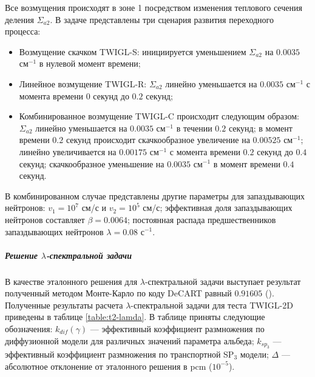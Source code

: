\documentclass{crm-article}
\begin{document}
Все возмущения происходят в зоне 1 посредством изменения теплового сечения деления $\Sigma_{a2}$.
В задаче представлены три сценария развития переходного процесса:
\begin{itemize}\itemsep1pt \parskip0pt 
\item Возмущение скачком TWIGL-S: инициируется уменьшением $\Sigma_{a2}$ на $0.0035$ см$^{-1}$ в нулевой момент времени;
\item Линейное возмущение TWIGL-R: $\Sigma_{a2}$ линейно уменьшается на $0.0035$ см$^{-1}$ с момента времени $0$ секунд до $0.2$ секунд;
\item Комбинированное возмущение TWIGL-C происходит следующим образом:
$\Sigma_{a2}$ линейно уменьшается на $0.0035$ см$^{-1}$ в течении $0.2$ секунд; в момент времени $0.2$ секунд происходит скачкообразное увеличение на $0.00525$ см$^{-1}$; линейно увеличивается на $0.00175$ см$^{-1}$  с момента времени $0.2$ секунд до $0.4$ секунд;  скачкообразное уменьшение на $0.0035$ см$^{-1}$ в момент времени $0.4$ секунд.
\end{itemize}
 
В комбинированном случае представлены другие параметры для запаздывающих нейтронов: $v_1 = 10^7$ см/с и $v_2 = 10^5$ см/с; эффективная доля запаздывающих нейтронов составляет $\beta = 0.0064$;  постоянная распада предшественников запаздывающих нейтронов $\lambda = 0.08$ с$^{-1}$. 

\subparagraph{Решение $\lambda$-спектральной задачи}
В качестве эталонного решения для $\lambda$-спектральной задачи выступает результат полученный методом Монте-Карло по коду DeCART равный $0.91605$ (\cite{joo2004}).
Полученные результаты расчета $\lambda$-спектральной задачи для теста TWIGL-2D приведены в таблице \ref{table:t2-lamda}.
В таблице приняты следующие обозначения: 
$k_{dif}(\gamma)$ --- эффективный коэффициент размножения по диффузионной модели для различных значений параметра альбеда; 
$k_{sp_3}$ --- эффективный коэффициент размножения по транспортной SP$_3$ модели;
$\Delta$ --- абсолютное отклонение от эталонного решения в pcm ($10^{-5}$).
\end{document}
